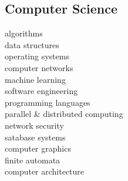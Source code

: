 \begin{minipage}[t]{0.33\textwidth}
\subsection{Computer Science}
algorithms \\
data structures \\
operating systems \\
computer networks \\
machine learning \\
software engineering \\
programming languages \\ 
parallel \& distributed computing \\
network security \\
satabase systems \\
computer graphics \\
finite automata \\
computer architecture \\

\sectionspace






\end{minipage} %
\hfill
%
%
